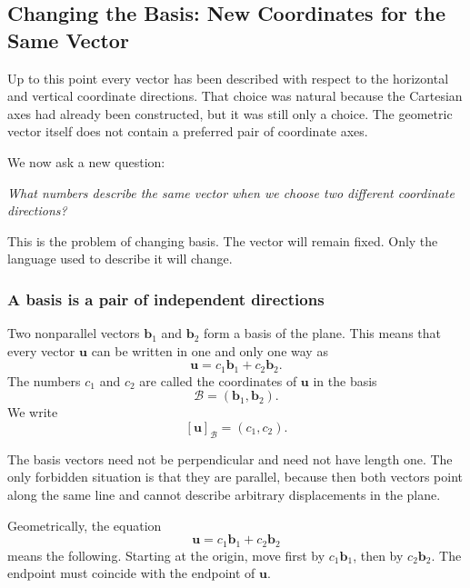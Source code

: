 \subsection{Changing the Basis: New Coordinates for the Same Vector}

Up to this point every vector has been described with respect to the horizontal
and vertical coordinate directions. That choice was natural because the
Cartesian axes had already been constructed, but it was still only a choice.
The geometric vector itself does not contain a preferred pair of coordinate
axes.

We now ask a new question:

\begin{center}
\emph{What numbers describe the same vector when we choose two different
coordinate directions?}
\end{center}

This is the problem of changing basis. The vector will remain fixed. Only the
language used to describe it will change.

\subsubsection*{A basis is a pair of independent directions}

\begin{definitionbox}
Two nonparallel vectors $\mathbf b_1$ and $\mathbf b_2$ form a basis of the
plane. This means that every vector $\mathbf u$ can be written in one and only
one way as
\[
\boxed{\mathbf u=c_1\mathbf b_1+c_2\mathbf b_2}.
\]
The numbers $c_1$ and $c_2$ are called the coordinates of $\mathbf u$ in the
basis
\[
\mathcal B=(\mathbf b_1,\mathbf b_2).
\]
We write
\[
[\mathbf u]_{\mathcal B}=(c_1,c_2).
\]
\end{definitionbox}

The basis vectors need not be perpendicular and need not have length one. The
only forbidden situation is that they are parallel, because then both vectors
point along the same line and cannot describe arbitrary displacements in the
plane.

Geometrically, the equation
\[
\mathbf u=c_1\mathbf b_1+c_2\mathbf b_2
\]
means the following. Starting at the origin, move first by
$c_1\mathbf b_1$, then by $c_2\mathbf b_2$. The endpoint must coincide with the
endpoint of $\mathbf u$.

